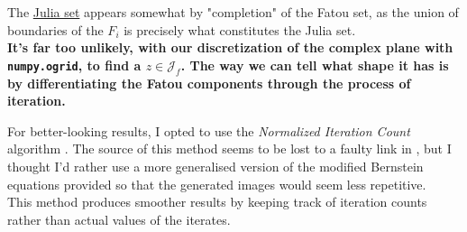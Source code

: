 \documentclass{article}
\begin{document}
The \underline{Julia set} appears somewhat by "completion" of the Fatou set, as the union of boundaries of the $F_i$ is precisely what constitutes the Julia set. \\
\vspace{5mm}
\textbf{It's far too unlikely, with our discretization of the complex plane with \texttt{numpy.ogrid}, to find a $z \in \mathcal{J}_f$. The way we can tell what shape it has is by differentiating the Fatou components through the process of iteration.} \\
\vspace{5mm}

For better-looking results, I opted to use the \textit{Normalized Iteration Count} algorithm \cite{Jon19}. The source of this method seems to be lost to a faulty link in \cite{Sil13}, but I thought I'd rather use a more generalised version of the modified Bernstein equations provided so that the generated images would seem less repetitive. \\
\vspace{2mm}
This method produces smoother results by keeping track of iteration counts rather than actual values of the iterates. \\
\pagebreak
\end{document}
